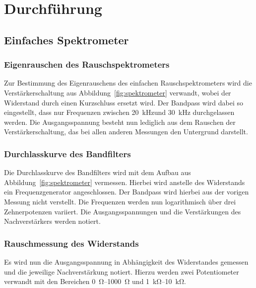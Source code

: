 

\section{Durchführung}

\subsection{Einfaches Spektrometer}
\label{sub:einfaches_spektrometer}

\subsubsection{Eigenrauschen des Rauschspektrometers}
\label{ssub:eigenrauschen_des_rauschspektrometers}

Zur Bestimmung des Eigenrauschens des einfachen Rauschspektrometers wird die
Verstärkerschaltung aus Abbildung~\ref{fig:spektrometer} verwandt, wobei der
Widerstand durch einen Kurzschluss ersetzt wird.
Der Bandpass wird dabei so eingestellt, dass nur Frequenzen zwischen
\SI{20}{\kilo\hertz}und \SI{30}{\kilo\hertz} durchgelassen
werden.  Die Ausgangsspannung besteht nun lediglich aus dem Rauschen der
Verstärkerschaltung, das bei allen anderen Messungen den Untergrund darstellt.

\subsubsection{Durchlasskurve des Bandfilters}
\label{ssub:durchlasskurve_des_bandfilters}

Die Durchlasskurve des Bandfilters wird mit dem Aufbau aus
Abbildung~\ref{fig:spektrometer} vermessen.
Hierbei wird anstelle des Widerstands ein Frequenzgenerator angeschlossen.
Der Bandpass wird hierbei aus der vorigen Messung nicht verstellt.
Die Frequenzen werden nun logarithmisch über drei Zehnerpotenzen variiert.
Die Ausgangsspannungen und die Verstärkungen des Nachverstärkers werden notiert.

\subsubsection{Rauschmessung des Widerstands}
\label{ssub:rauschmessung_des_widerstands}

Es wird nun die Ausgangsspannung in Abhängigkeit des Widerstandes gemessen und
die jeweilige Nachverstärkung notiert.
Hierzu werden zwei Potentiometer verwandt mit den Bereichen
\SIrange[range-phrase=--, range-units=single]{0}{1000}{\ohm}
und
\SIrange[range-phrase=--, range-units=single]{1}{10}{\kilo\ohm}.

